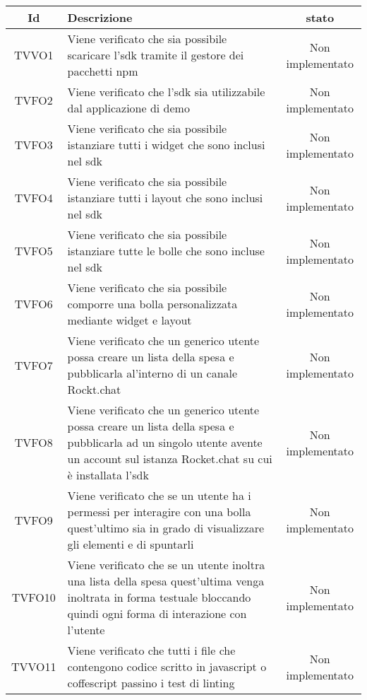 \begin{center}
	\begin{longtable}{|c|>{\centering}m{10cm}|c|}\hline
		Id & Descrizione & stato \\ \hline
		TVVO1 & Viene verificato che sia possibile scaricare l'sdk tramite il gestore dei pacchetti npm & Non implementato \\ \hline
		TVFO2 & Viene verificato che l'sdk sia utilizzabile dal applicazione di demo & Non implementato \\ \hline
		TVFO3 & Viene verificato che sia possibile istanziare tutti i widget che sono inclusi nel sdk & Non implementato \\ \hline
		TVFO4 & Viene verificato che sia possibile istanziare tutti i layout che sono inclusi nel sdk & Non implementato \\ \hline
		TVFO5 & Viene verificato che sia possibile istanziare tutte le bolle che sono incluse nel sdk & Non implementato \\ \hline
		TVFO6 & Viene verificato che sia possibile comporre una bolla personalizzata mediante widget e layout & Non implementato \\ \hline
		TVFO7 & Viene verificato che un generico utente possa creare un lista della spesa e pubblicarla al'interno di un canale Rockt.chat & Non implementato \\ \hline
		TVFO8 & Viene verificato che un generico utente possa creare un lista della spesa e pubblicarla ad un singolo utente avente un account sul istanza Rocket.chat su cui è installata l'sdk & Non implementato \\ \hline
		TVFO9 & Viene verificato che se un utente ha i permessi per interagire con una bolla quest'ultimo sia in grado di visualizzare gli elementi e di spuntarli & Non implementato \\ \hline
		TVFO10 & Viene verificato che se un utente inoltra una lista della spesa quest'ultima venga inoltrata in forma testuale bloccando quindi ogni forma di interazione con l'utente & Non implementato \\ \hline
		TVVO11 & Viene verificato che tutti i file che contengono codice scritto in javascript o coffescript passino i test di linting & Non implementato \\ \hline
	\end{longtable}
\end{center}
